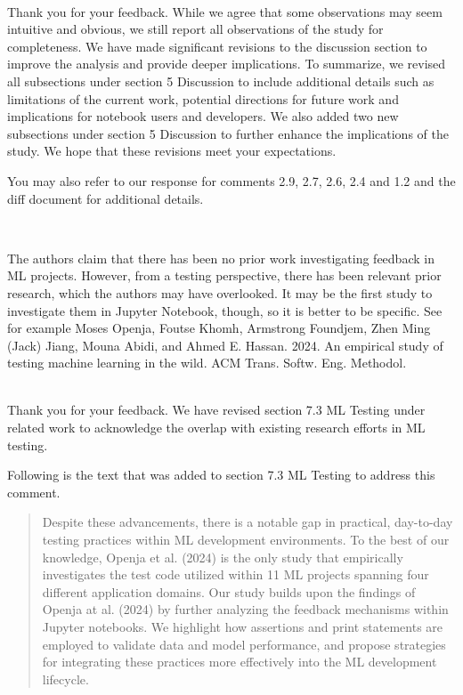 \documentclass[11pt,fleqn]{article}
\newcommand{\eline}{\vspace*{.75\baselineskip}}
\newcommand{\Referee}[1]{\eline \noindent {\bf Reviewer comment #1:} \\}
\newcommand{\Us}{\eline \noindent {\bf Response:}\\}
\newenvironment{revcomment}[1][]
{\Referee{#1}\begin{rcomment}}
{\end{rcomment}}
\begin{document}
\Us Thank you for your feedback. While we agree that some observations may seem intuitive and obvious, we still report all observations of the study for completeness. We have made significant revisions to the discussion section to improve the analysis and provide deeper implications. To summarize, we revised all subsections under section 5 Discussion to include additional details such as limitations of the current work, potential directions for future work and implications for notebook users and developers. We also added two new subsections under section 5 Discussion to further enhance the implications of the study. We hope that these revisions meet your expectations.

You may also refer to our response for comments 2.9, 2.7, 2.6, 2.4 and 1.2 and the diff document for additional details.

\begin{revcomment}[3.9]
  The authors claim that there has been no prior work investigating feedback in ML projects. However, from a testing perspective, there has been relevant prior research, which the authors may have overlooked. It may be the first study to investigate them in Jupyter Notebook, though, so it is better to be specific. See for example Moses Openja, Foutse Khomh, Armstrong Foundjem, Zhen Ming (Jack) Jiang, Mouna Abidi, and Ahmed E. Hassan. 2024. An empirical study of testing machine learning in the wild. ACM Trans. Softw. Eng. Methodol.
\end{revcomment}

\Us Thank you for your feedback. We have revised section 7.3 ML Testing under related work to acknowledge the overlap with existing research efforts in ML testing.

Following is the text that was added to section 7.3 ML Testing to address this comment.

\begin{quote}
  Despite these advancements, there is a notable gap in practical, day-to-day testing practices within ML development environments. To the best of our knowledge, Openja et al. (2024) is the only study that empirically investigates the test code utilized within 11 ML projects spanning four different application domains. Our study builds upon the findings of Openja at al. (2024) by further analyzing the feedback mechanisms within Jupyter notebooks. We highlight how assertions and print statements are employed to validate data and model performance, and propose strategies for integrating these practices more effectively into the ML development lifecycle.
\end{quote}
\end{document}
